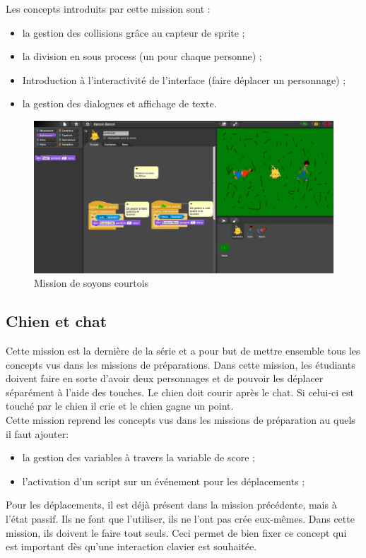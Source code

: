 Les concepts introduits par cette mission sont :
\begin{itemize}
\item la gestion des collisions grâce au capteur de sprite ;
\item la division en sous process (un pour chaque personne) ;
\item Introduction à l'interactivité de l'interface (faire déplacer un personnage) ;
\item la gestion des dialogues et affichage de texte.
\end{itemize}
\begin{figure}[ht]
  \begin{center}
    \includegraphics[scale=0.3]{content/7-solution/1-missions/images/courtois}
    \caption{Mission de soyons courtois}
    \label{fig:courtois}
  \end{center}
\end{figure}
\subsection{Chien et chat}
\label{chien-chat}
Cette mission est la dernière de la série et a pour but de mettre ensemble tous les concepts vus dans les missions de préparations. Dans cette mission, les étudiants doivent faire en sorte d'avoir deux personnages et de pouvoir les déplacer séparément à l'aide des touches. Le chien doit courir après le chat. Si celui-ci est touché par le chien il crie et le chien gagne un point.\\

Cette mission reprend les concepts vus dans les missions de préparation au quels il faut ajouter:
\begin{itemize}
\item la gestion des variables à travers la variable de score ;
\item l'activation d'un script sur un événement pour les déplacements ;
\end{itemize}

Pour les déplacements, il est déjà présent dans la mission précédente, mais à l'état passif. Ils ne font que l'utiliser, ils ne l'ont pas crée eux-mêmes. Dans cette mission, ils doivent le faire tout seuls. Ceci permet de bien fixer ce concept qui est important dès qu'une interaction clavier est souhaitée.

